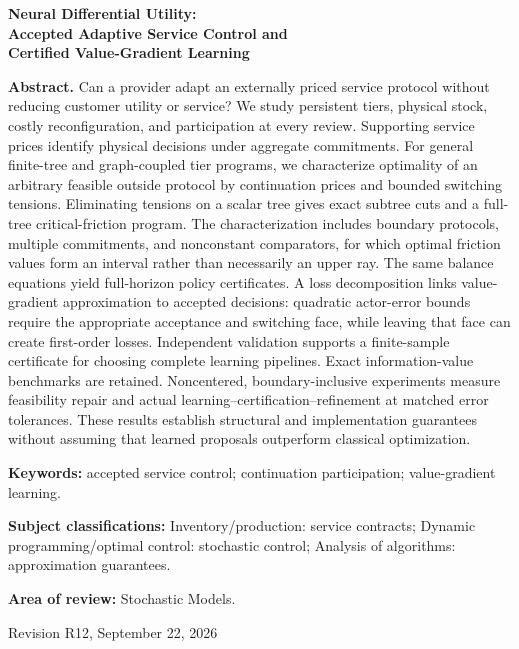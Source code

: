 \documentclass[11pt,letterpaper]{article}
\theoremstyle{definition}
\newcommand{\1}{\mathbf 1}
\begin{document}
\begin{titlepage}\centering
{\Large\bfseries Neural Differential Utility:\\ Accepted Adaptive Service Control and\\ Certified Value-Gradient Learning\par}
\vspace{.3in}{Anonymous manuscript for Operations Research\par}\vspace{.25in}
\begin{minipage}{\textwidth}
\textbf{Abstract.}
Can a provider adapt an externally priced service protocol without reducing customer utility or service? We study persistent tiers, physical stock, costly reconfiguration, and participation at every review. Supporting service prices identify physical decisions under aggregate commitments. For general finite-tree and graph-coupled tier programs, we characterize optimality of an arbitrary feasible outside protocol by continuation prices and bounded switching tensions. Eliminating tensions on a scalar tree gives exact subtree cuts and a full-tree critical-friction program. The characterization includes boundary protocols, multiple commitments, and nonconstant comparators, for which optimal friction values form an interval rather than necessarily an upper ray. The same balance equations yield full-horizon policy certificates. A loss decomposition links value-gradient approximation to accepted decisions: quadratic actor-error bounds require the appropriate acceptance and switching face, while leaving that face can create first-order losses. Independent validation supports a finite-sample certificate for choosing complete learning pipelines. Exact information-value benchmarks are retained. Noncentered, boundary-inclusive experiments measure feasibility repair and actual learning--certification--refinement at matched error tolerances. These results establish structural and implementation guarantees without assuming that learned proposals outperform classical optimization.
\par\vspace{.16in}\textbf{Keywords:} accepted service control; continuation participation; value-gradient learning.
\par\vspace{.10in}\textbf{Subject classifications:} Inventory/production: service contracts; Dynamic programming/optimal control: stochastic control; Analysis of algorithms: approximation guarantees.
\par\vspace{.10in}\textbf{Area of review:} Stochastic Models.
\end{minipage}\vfill{Revision R12, September 22, 2026\par}\end{titlepage}
\end{document}

